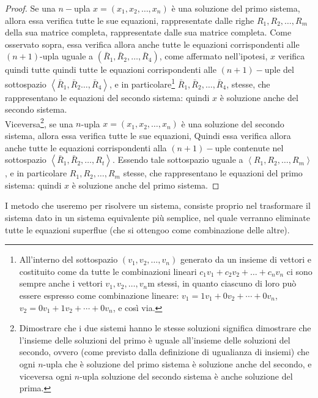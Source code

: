 \documentclass{book}
\theoremstyle{definition}
\theoremstyle{plain}
\begin{document}
\begin{proof}
  Se una $n-$upla $x=(x_1,x_2,\dots,x_n)$ è una soluzione del primo
  sistema, allora essa verifica tutte le sue equazioni, rappresentate
  dalle righe $R_1,R_2,\dots,R_m$ della sua matrice completa,
  rappresentate dalle sua matrice completa. Come osservato sopra, essa
  verifica allora anche tutte le equazioni corrispondenti alle
  $(n+1)$-upla uguale a $(\bar{R}_1,\bar{R}_2,\dots,\bar{R}_4)$, come
  affermato nell'ipotesi, $x$ verifica quindi tutte quindi tutte
  le equazioni corrispondenti alle $(n+1)-$uple del sottospazio
  $\left\langle \bar{R}_1,\bar{R}_2\dots,\bar{R}_4
\right\rangle$, e in
  particolare\footnote{All'interno del sottospazio $(v_1,v_2,\dots,v_n)$
    generato da un insieme di vettori e costituito come da tutte le
    combinazioni lineari $c_1v_1+c_2v_2+\dots+c_nv_n$ ci sono sempre
    anche i vettori $v_1,v_2,\dots,v_n$m stessi, in quanto ciascuno di
    loro può essere espresso come combinazione lineare:
    $v_1=1v_1+0v_2+\cdots+0v_n$, $v_2=0v_1+1v_2+\cdots+0v_n$, e così via.}
  $\bar{R}_1,\bar{R}_2,\dots,\bar{R}_4$, stesse, che rappresentano le
  equazioni del secondo sistema: quindi $x$ è soluzione anche del secondo
  sistema.\\
  Viceversa\footnote{Dimostrare che i due sistemi hanno le stesse
    soluzioni significa dimostrare che l'insieme delle soluzioni del
    primo è uguale all'insieme delle soluzioni del secondo, ovvero (come
    previsto dalla definizione di ugualianza di insiemi) che ogni
    $n$-upla che è soluzione del primo sistema è soluzione anche del
    secondo, e viceversa ogni $n$-upla soluzione del secondo sistema è
    anche soluzione del prima.}, se una $n$-upla $x=(x_1,x_2,\dots,x_n)$
  è una soluzione del secondo sistema, allora essa verifica tutte le sue
  equazioni, Quindi essa verifica allora anche tutte le equazioni
  corrispondenti alla $(n+1)-$uple contenute nel sottospazio $\left\langle
    \bar{R}_1,\bar{R}_2,\dots,R_t
  \right\rangle$. Essendo tale sottospazio uguale a $\left\langle
    R_1,R_2,\dots,R_m
  \right\rangle$, e in particolare $R_1,R_2,\dots,R_m$ stesse, che
  rappresentano le equazioni del primo sistema: quindi $x$ è soluzione
  anche del primo sistema.
\end{proof}
I metodo che useremo per risolvere un sistema, consiste proprio nel
trasformare il sistema dato in un sistema equivalente più semplice, nel
quale verranno eliminate tutte le equazioni superflue (che si ottengoo
come combinazione delle altre).
\end{document}
